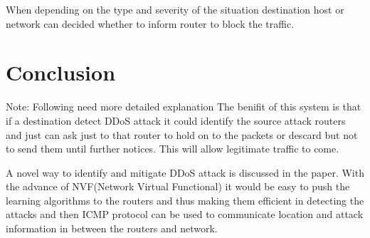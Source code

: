 \documentclass[10pt,oneside,a4paper]{article}
\begin{document}
When depending on the type and severity of the situation destination host or network can decided whether to inform router to block the traffic.

\section{Conclusion}

{Note: Following need more detailed explanation}
The benifit of this system is that if a destination detect DDoS attack it could identify the source attack routers and just can ask just to that router to hold on to the packets or descard but not to send them until further notices. This will allow legitimate traffic to come.

A novel way to identify and mitigate DDoS attack is discussed in the paper. With the advance of NVF(Network Virtual Functional) it would be easy to push the learning algorithms to the routers and thus making them efficient in detecting the attacks and then ICMP protocol can be used to communicate location and attack information in between the routers and network.

\end{document}
